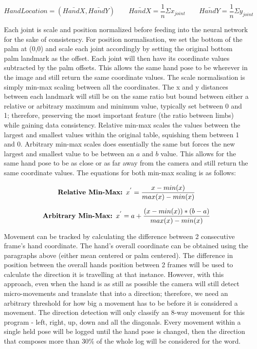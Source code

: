 \documentclass[11pt]{article}
\begin{document}
        \[HandLocation = (\bar{HandX}, \bar{HandY}) \qquad{}
        \bar{HandX} = \frac{1}{n}\Sigma x_{joint} \qquad{}
        \bar{HandY}  = \frac{1}{n}\Sigma y_{joint}
        \]
        \vskip 0.3cm

        Each joint is scale and position normalized before feeding into the neural network for the sake of consistency. For position normalisation, we set the bottom of the palm at (0,0) and scale each joint accordingly by setting the original bottom palm landmark as the offset. Each joint will then have its coordinate values subtracted by the palm offsets. This allows the same hand pose to be wherever in the image and still return the same coordinate values. The scale normalisation is simply min-max scaling between all the coordinates. The x and y distances between each landmark will still be on the same ratio but bound between either a relative or arbitrary maximum and minimum value, typically set between 0 and 1; therefore, preserving the most important feature (the ratio between limbs) while gaining data consistency. Relative min-max scales the values between the largest and smallest values within the original table, squishing them between 1 and 0. Arbitrary min-max scales does essentially the same but forces the new largest and smallest value to be between an $a$ and $b$ value. This allows for the same hand pose to be as close or as far away from the camera and still return the same coordinate values. The equations for both min-max scaling is as follows:

        \vskip 0.3cm
        \[
        \text{\bf{Relative Min-Max: }} x^{'} = \frac{x-min(x)}{max(x)-min(x)} 
        \]

        \[
        \text{\bf{Arbitrary Min-Max: }} x^{'} = a + \frac{(x-min(x))*(b-a)}{max(x)-min(x)}
        \] 
        \vskip 0.3cm

        Movement can be tracked by calculating the difference between 2 consecutive frame's hand coordinate. The hand's overall coordinate can be obtained using the paragraphs above (either mean centered or palm centered). The difference in position between the overall hands position between 2 frames will be used to calculate the direction it is travelling at that instance. However, with this approach, even when the hand is as still as possible the camera will still detect micro-movements and translate that into a direction; therefore, we need an arbitrary threshold for how big a movement has to be before it is considered a movement. The direction detection will only classify an 8-way movement for this program - left, right, up, down and all the diagonals. Every movement within a single held pose will be logged until the hand pose is changed, then the direction that composes more than 30\% of the whole log will be considered for the word. 
\end{document}
